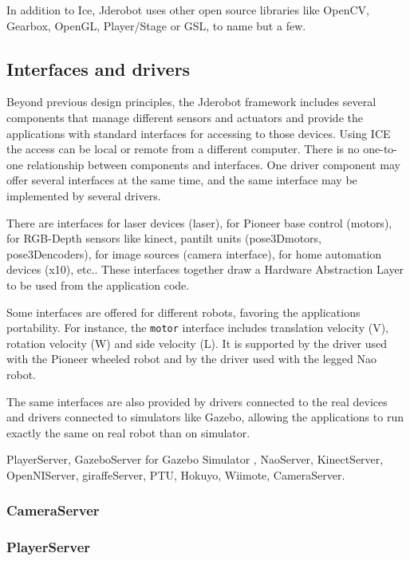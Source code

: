 \documentclass[twocolumn]{svjour3}          %
\begin{document}
In addition to Ice, Jderobot uses other open source libraries like OpenCV, Gearbox, OpenGL, Player/Stage or GSL, to name but a few.

\subsection{Interfaces and drivers}

Beyond previous design principles, the Jderobot framework includes several components that manage different sensors and actuators and provide the applications with standard interfaces for accessing to those devices. Using ICE the access can be local or remote from a different computer. There is no one-to-one relationship between components and interfaces. One driver component may offer several interfaces at the same time, and the same interface may be implemented by several drivers.

There are interfaces for laser devices (laser), for Pioneer base control (motors), for RGB-Depth sensors like kinect, pantilt units (pose3Dmotors, pose3Dencoders), for image sources (camera interface), for home automation devices (x10), etc.. These interfaces together draw a Hardware Abstraction Layer to be used from the application code. 

Some interfaces are offered for different robots, favoring the applications portability. For instance, the \texttt{motor} interface includes translation velocity (V), rotation velocity (W) and side velocity (L). It is supported by the driver used with the Pioneer wheeled robot and by the driver used with the legged Nao robot.

The same interfaces are also provided by drivers connected to the real devices and drivers connected to simulators like Gazebo, allowing the applications to run exactly the same on real robot than on simulator. 

PlayerServer, GazeboServer for Gazebo Simulator , NaoServer, KinectServer, OpenNIServer, giraffeServer, PTU, Hokuyo, Wiimote, CameraServer.

\subsubsection{CameraServer}

\subsubsection{PlayerServer}
\end{document}
